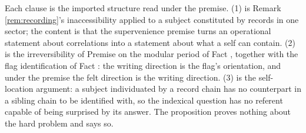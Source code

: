 Each clause is the imported structure read under the premise. (1) is Remark \ref{rem:recording}'s inaccessibility applied to a subject constituted by records in one sector; the content is that the supervenience premise turns an operational statement about correlations into a statement about what a self can contain. (2) is the irreversibility of Premise  on the modular period of Fact , together with the flag identification of Fact : the writing direction is the flag's orientation, and under the premise the felt direction is the writing direction. (3) is the self-location argument: a subject individuated by a record chain has no counterpart in a sibling chain to be identified with, so the indexical question has no referent capable of being surprised by its answer. The proposition proves nothing about the hard problem and says so.
